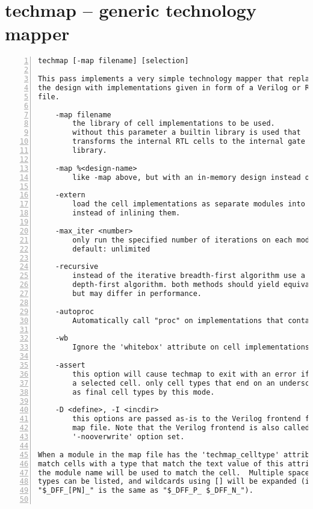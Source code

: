 \section{techmap -- generic technology mapper}
\label{cmd:techmap}
\begin{lstlisting}[numbers=left,frame=single]
    techmap [-map filename] [selection]

This pass implements a very simple technology mapper that replaces cells in
the design with implementations given in form of a Verilog or RTLIL source
file.

    -map filename
        the library of cell implementations to be used.
        without this parameter a builtin library is used that
        transforms the internal RTL cells to the internal gate
        library.

    -map %<design-name>
        like -map above, but with an in-memory design instead of a file.

    -extern
        load the cell implementations as separate modules into the design
        instead of inlining them.

    -max_iter <number>
        only run the specified number of iterations on each module.
        default: unlimited

    -recursive
        instead of the iterative breadth-first algorithm use a recursive
        depth-first algorithm. both methods should yield equivalent results,
        but may differ in performance.

    -autoproc
        Automatically call "proc" on implementations that contain processes.

    -wb
        Ignore the 'whitebox' attribute on cell implementations.

    -assert
        this option will cause techmap to exit with an error if it can't map
        a selected cell. only cell types that end on an underscore are accepted
        as final cell types by this mode.

    -D <define>, -I <incdir>
        this options are passed as-is to the Verilog frontend for loading the
        map file. Note that the Verilog frontend is also called with the
        '-nooverwrite' option set.

When a module in the map file has the 'techmap_celltype' attribute set, it will
match cells with a type that match the text value of this attribute. Otherwise
the module name will be used to match the cell.  Multiple space-separated cell
types can be listed, and wildcards using [] will be expanded (ie.
"$_DFF_[PN]_" is the same as "$_DFF_P_ $_DFF_N_").


\end{lstlisting}
